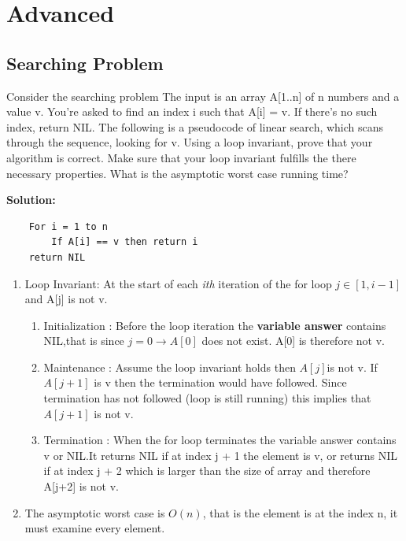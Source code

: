 \documentclass[11pt,fleqn]{book}
\begin{document}
\section{Advanced}
\subsection{Searching Problem}
\begin{example}
Consider the searching problem The input is an array A[1..n] of n numbers and a value v. You're asked to find an index i such that A[i] = v. If there's no such index, return NIL. The following is a pseudocode of linear search, which scans through the sequence, looking for v. Using a loop invariant, prove that your algorithm is correct. Make sure that your loop invariant fulfills the there necessary properties. What is the asymptotic worst case running time? 
\end{example}
\textbf{Solution: } 
\begin{lstlisting}
    For i = 1 to n
        If A[i] == v then return i 
    return NIL
\end{lstlisting}
\begin{enumerate}
        \item Loop Invariant: 
        At the start of each \textit{ith} iteration of the for loop $j \in [1, i-1]$ and A[j] is not v.
        \begin{enumerate}
        \item Initialization : Before the loop iteration the \textbf{variable answer} contains NIL,that is since $j = 0 \rightarrow A[0]$ does not exist. A[0] is therefore not v.
        \item Maintenance : Assume the loop invariant holds then $A[j]$is not v. If $A[j+1]$ is v then the termination would have followed. Since termination has not followed (loop is still running) this implies that $A[j+1]$ is not v. 
        \item Termination : When the for loop terminates the variable answer contains v or NIL.It returns NIL if at index j + 1 the element is v, or returns NIL if at index j + 2 which is larger than the size of array and therefore A[j+2] is not v. 
        \end{enumerate}
        \item The asymptotic worst case is $O(n)$, that is the element is at the index n, it must examine every element. 
\end{enumerate}
\end{document}
